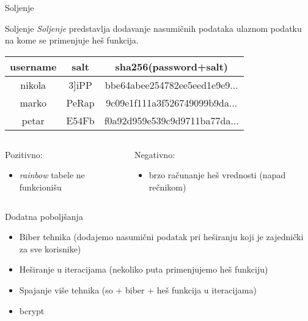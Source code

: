 \documentclass[aspectratio=169,xcolor=dvipsnames]{beamer}
\begin{document}
\begin{frame}{Soljenje}

    \begin{block}{Soljenje}
        \textit{Soljenje} predstavlja dodavanje nasumičnih podataka ulaznom
        podatku na kome se primenjuje heš funkcija.
    \end{block}

    \vspace{1em}

    \begin{center}
        \begin{tabular}{c|c|c}
            username & salt & sha256(password+salt) \\
            \hline
            nikola & 3]iPP &
            bbe64abee254782ee5eed1e9e9...\\
            marko & PeRap & 9c09e1f111a3f526749099b9da... \\
            petar & E54Fb & f0a92d959e539c9d9711ba77da...
        \end{tabular}
    \end{center}

    \vspace{1em}

    \begin{columns}
        \begin{column}{0.4\textwidth}
            \pause
            Pozitivno:
            \pause
            \begin{itemize}
                \item \emph{rainbow} tabele ne funkcionišu
            \end{itemize}
        \end{column}
        \begin{column}{0.4\textwidth}
            \pause
            Negativno:
            \pause
            \begin{itemize}
                \item brzo računanje heš vrednosti (napad rečnikom)
            \end{itemize}
        \end{column}
    \end{columns}

\end{frame}


\begin{frame}{Dodatna poboljšanja}

    \begin{itemize}
        \item Biber tehnika (dodajemo nasumični podatak pri heširanju koji je
            zajednički za sve korisnike)
        \item Heširanje u iteracijama (nekoliko puta primenjujemo heš funkciju)
        \item Spajanje više tehnika (so + biber + heš funkcija u iteracijama)
        \item bcrypt\cite{pass3}
    \end{itemize}

\end{frame}
\end{document}
